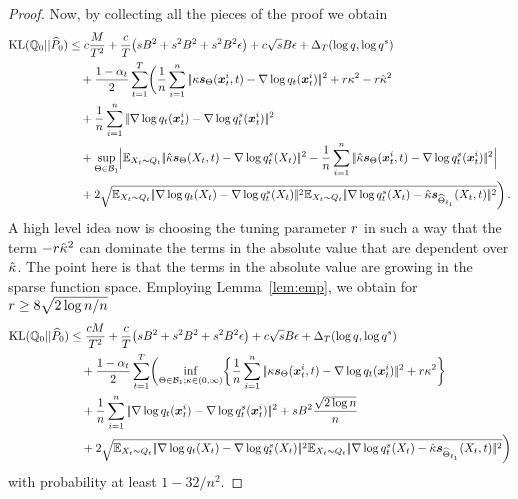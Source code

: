 \begin{proof}
Now, by collecting all the pieces of the proof we obtain 
\begin{align*}
     \KL(\Fd_0 ||\BdA_0) &\le \COr\frac{\FSM}{T^2}+\frac{\COr}{T}\bigl(s\DerBound^2+  s^2\DerBound^2+ s^2\DerBound^2\epsilon\bigr)+\COr\sqrt{s}\DerBound \epsilon+\deltaT \notag\\
     &~~~+\frac{1-\alpha_t}{2}  \sum_{t=1}^{T} \biggl(\frac{1}{n} \sum_{i=1}^{n}  \norm{\scale\scoref(\x_t^i,t)-\nabla\log q_t(\x_t^i)}^2+\tuning\scale^2-\tuning\scaleh^2\\
      &~~~+\frac{1}{n} \sum_{i=1}^{n}  \norm{\nabla \log q_t(\x_t^i)-\nabla\log q^s_t(\x_t^i)}^2\\
     &~~~+\sup_{\NetP\in \paramspaceone}\Bigl|\E_{X_t\sim Q_t}\norm{\scaleh\scoref(X_t,t)-\nabla\log q^s_t(X_t)}^2
     -\frac{1}{n} \sum_{i=1}^{n}  \norm{\scaleh\scoref(\x_t^i,t)-\nabla\log q^s_t(\x_t^i)}^2\Bigr|\\
     &~~~+2\sqrt{\E_{X_t\sim Q_t}\norm{\nabla\log \Fdd_t(X_t)-\nabla\log \Fdds_t(X_t)}^2\E_{X_t\sim Q_t}\norm{\nabla\log \Fdds_t(X_t)-\scaleh\scorefh(X_t,t)}^2}\biggr)\,.
\end{align*}
A high level idea now is choosing the tuning parameter  $\textcolor{black}{r}$ in such a way that the term $-\textcolor{black}{r}\hat{\kappa}^2$ can dominate the  terms in the absolute value that are dependent over $\hat{\kappa}$. 
The point here is that the terms in the absolute value are growing in the sparse function space.
Employing Lemma~\ref{lem:emp}, we obtain for 
$\textcolor{black}{r}\ge 8  \sqrt{2\log n /n}$ 
\begin{align*}
     \KL(\Fd_0 ||\BdA_0) &\le \frac{\COr\FSM}{T^2}+\frac{\COr}{T}\bigl(s\DerBound^2+  s^2\DerBound^2+ s^2\DerBound^2\epsilon\bigr)+\COr\sqrt{s}\DerBound \epsilon+\deltaT\notag\\
     &~~~+\frac{1-\alpha_t}{2}   \sum_{t=1}^{T} \biggl(\inf_{\NetP\in \paramspaceone; \scale\in (0,\infty)}\biggl\{\frac{1}{n} \sum_{i=1}^{n}  \norm{\scale\scoref(\x_t^i,t)-\nabla\log q_t(\x_t^i)}^2+\tuning\scale^2\biggr\}\\
      &~~~+\frac{1}{n} \sum_{i=1}^{n}  \norm{\nabla \log q_t(\x_t^i)-\nabla\log q^s_t(\x_t^i)}^2+ s\DerBound^2\frac{\sqrt{2\log n}}{n}\\
      &~~~+2\sqrt{\E_{X_t\sim Q_t}\norm{\nabla\log \Fdd_t(X_t)-\nabla\log \Fdds_t(X_t)}^2\E_{X_t\sim Q_t}\norm{\nabla\log \Fdds_t(X_t)-\scaleh\scorefh(X_t,t)}^2}\biggr)
\end{align*}
with probability at least $1-32/n^2$.



\end{proof}
